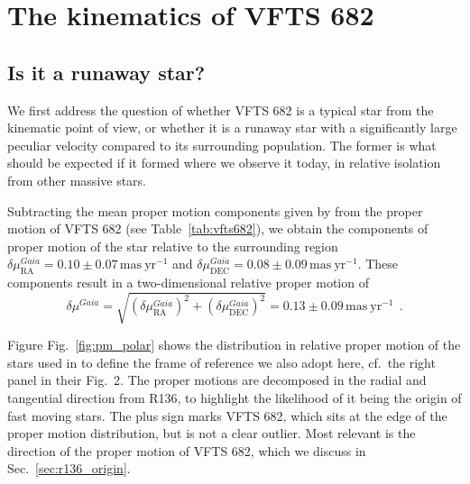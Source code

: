 \documentclass[apjl,twocolumn]{emulateapj}
\DeclareRobustCommand{\Figref}[1]{Fig.~\ref{#1}}
\DeclareRobustCommand{\Tabref}[1]{Table~\ref{#1}}
\DeclareRobustCommand{\Secref}[1]{Sec.~\ref{#1}}
\begin{document}
\section{The kinematics of VFTS 682}
\label{sec:results}

\subsection{Is it a runaway star?}
\label{sec:runaway}
We first address the question of whether VFTS 682 is a typical star
from the kinematic point of view, or whether it is a runaway star with
a significantly large peculiar velocity compared to its surrounding population. The former is what should
be expected if it formed where we observe it today, in relative
isolation from other massive stars.

Subtracting the mean proper motion components given by
\citep{lennon:18} from the
proper motion of VFTS 682 (see \Tabref{tab:vfts682}), we obtain the
components of proper motion of the star relative to the surrounding region
$\delta\mu_\mathrm{RA}^{Gaia} = 0.10 \pm 0.07\,\mathrm{mas\ yr^{-1}}$
and $\delta\mu_\mathrm{DEC}^{Gaia} = 0.08
\pm 0.09\,\mathrm{mas\ yr^{-1}}$. These components result in a
two-dimensional relative proper motion of
\begin{equation}
  \label{eq:pm_gaia_around}
  \delta \mu^{Gaia} = \sqrt{\left(\delta\mu_\mathrm{RA}^{Gaia}\right)^2+\left(\delta\mu_\mathrm{DEC}^{Gaia}\right)^2}
  = 0.13\pm 0.09\,\mathrm{mas\
  yr^{-1}} \ \ .
\end{equation}

Figure \Figref{fig:pm_polar} shows the distribution in relative proper motion
of the stars used in \cite{lennon:18} to define the frame of reference
we also adopt here, cf.~the right panel in their Fig.~2. The
proper motions are decomposed in the radial and tangential direction
from R136, to highlight the likelihood of it being the origin of fast
moving stars. The plus sign marks VFTS 682, which sits at the edge of
the proper motion distribution, but is not a clear outlier. Most
relevant is the direction of the proper motion of VFTS 682, which we
discuss in \Secref{sec:r136_origin}.
\end{document}

